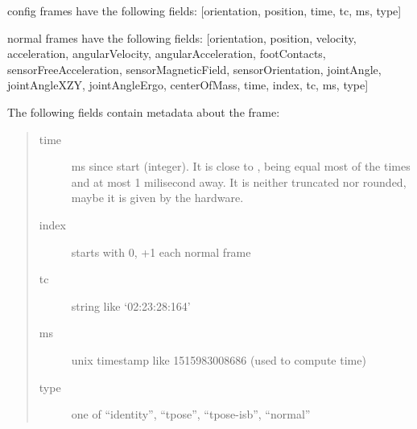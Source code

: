 \documentclass[letterpaper,10pt,english,openany,oneside]{sphinxmanual}
\begin{document}
\begin{sphinxVerbatim}[commandchars=\\\{\}]
\PYGZsh{} config frames have the following fields:
[\PYGZsq{}orientation\PYGZsq{}, \PYGZsq{}position\PYGZsq{}, \PYGZsq{}time\PYGZsq{}, \PYGZsq{}tc\PYGZsq{}, \PYGZsq{}ms\PYGZsq{}, \PYGZsq{}type\PYGZsq{}]

\PYGZsh{} normal frames have the following fields:
[\PYGZsq{}orientation\PYGZsq{}, \PYGZsq{}position\PYGZsq{}, \PYGZsq{}velocity\PYGZsq{}, \PYGZsq{}acceleration\PYGZsq{},
 \PYGZsq{}angularVelocity\PYGZsq{}, \PYGZsq{}angularAcceleration\PYGZsq{}, \PYGZsq{}footContacts\PYGZsq{},
 \PYGZsq{}sensorFreeAcceleration\PYGZsq{}, \PYGZsq{}sensorMagneticField\PYGZsq{}, \PYGZsq{}sensorOrientation\PYGZsq{},
 \PYGZsq{}jointAngle\PYGZsq{}, \PYGZsq{}jointAngleXZY\PYGZsq{}, \PYGZsq{}jointAngleErgo\PYGZsq{}, \PYGZsq{}centerOfMass\PYGZsq{}, \PYGZsq{}time\PYGZsq{},
 \PYGZsq{}index\PYGZsq{}, \PYGZsq{}tc\PYGZsq{}, \PYGZsq{}ms\PYGZsq{}, \PYGZsq{}type\PYGZsq{}]
\end{sphinxVerbatim}

The following fields contain metadata about the frame:
\begin{quote}\begin{description}
\item[{time}] \leavevmode
ms since start (integer). It is close to
, being equal most of the times and
at most 1 milisecond away. It is neither truncated nor rounded, maybe it
is given by the hardware.

\item[{index}] \leavevmode
starts with 0, +1 each normal frame

\item[{tc}] \leavevmode
string like ‘02:23:28:164’

\item[{ms}] \leavevmode
unix timestamp like 1515983008686 (used to compute time)

\item[{type}] \leavevmode
one of “identity”, “tpose”, “tpose-isb”, “normal”

\end{description}\end{quote}
\end{document}
